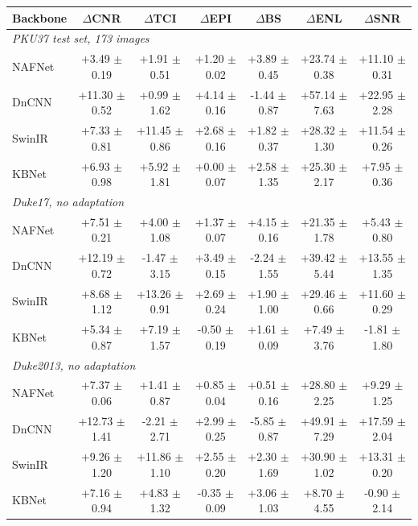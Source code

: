 \begin{tabular}{lcccccc}
\toprule
Backbone & $\Delta$CNR & $\Delta$TCI & $\Delta$EPI & $\Delta$BS & $\Delta$ENL & $\Delta$SNR \\
\midrule
\multicolumn{7}{l}{\textit{PKU37 test set, 173 images}} \\
\midrule
NAFNet & +3.49 $\pm$ 0.19 & +1.91 $\pm$ 0.51 & +1.20 $\pm$ 0.02 & +3.89 $\pm$ 0.45 & +23.74 $\pm$ 0.38 & +11.10 $\pm$ 0.31 \\
DnCNN & +11.30 $\pm$ 0.52 & +0.99 $\pm$ 1.62 & +4.14 $\pm$ 0.16 & -1.44 $\pm$ 0.87 & +57.14 $\pm$ 7.63 & +22.95 $\pm$ 2.28 \\
SwinIR & +7.33 $\pm$ 0.81 & +11.45 $\pm$ 0.86 & +2.68 $\pm$ 0.16 & +1.82 $\pm$ 0.37 & +28.32 $\pm$ 1.30 & +11.54 $\pm$ 0.26 \\
KBNet & +6.93 $\pm$ 0.98 & +5.92 $\pm$ 1.81 & +0.00 $\pm$ 0.07 & +2.58 $\pm$ 1.35 & +25.30 $\pm$ 2.17 & +7.95 $\pm$ 0.36 \\
\midrule
\multicolumn{7}{l}{\textit{Duke17, no adaptation}} \\
\midrule
NAFNet & +7.51 $\pm$ 0.21 & +4.00 $\pm$ 1.08 & +1.37 $\pm$ 0.07 & +4.15 $\pm$ 0.16 & +21.35 $\pm$ 1.78 & +5.43 $\pm$ 0.80 \\
DnCNN & +12.19 $\pm$ 0.72 & -1.47 $\pm$ 3.15 & +3.49 $\pm$ 0.15 & -2.24 $\pm$ 1.55 & +39.42 $\pm$ 5.44 & +13.55 $\pm$ 1.35 \\
SwinIR & +8.68 $\pm$ 1.12 & +13.26 $\pm$ 0.91 & +2.69 $\pm$ 0.24 & +1.90 $\pm$ 1.00 & +29.46 $\pm$ 0.66 & +11.60 $\pm$ 0.29 \\
KBNet & +5.34 $\pm$ 0.87 & +7.19 $\pm$ 1.57 & -0.50 $\pm$ 0.19 & +1.61 $\pm$ 0.09 & +7.49 $\pm$ 3.76 & -1.81 $\pm$ 1.80 \\
\midrule
\multicolumn{7}{l}{\textit{Duke2013, no adaptation}} \\
\midrule
NAFNet & +7.37 $\pm$ 0.06 & +1.41 $\pm$ 0.87 & +0.85 $\pm$ 0.04 & +0.51 $\pm$ 0.16 & +28.80 $\pm$ 2.25 & +9.29 $\pm$ 1.25 \\
DnCNN & +12.73 $\pm$ 1.41 & -2.21 $\pm$ 2.71 & +2.99 $\pm$ 0.25 & -5.85 $\pm$ 0.87 & +49.91 $\pm$ 7.29 & +17.59 $\pm$ 2.04 \\
SwinIR & +9.26 $\pm$ 1.20 & +11.86 $\pm$ 1.10 & +2.55 $\pm$ 0.20 & +2.30 $\pm$ 1.69 & +30.90 $\pm$ 1.02 & +13.31 $\pm$ 0.20 \\
KBNet & +7.16 $\pm$ 0.94 & +4.83 $\pm$ 1.32 & -0.35 $\pm$ 0.09 & +3.06 $\pm$ 1.03 & +8.70 $\pm$ 4.55 & -0.90 $\pm$ 2.14 \\
\bottomrule
\end{tabular}
